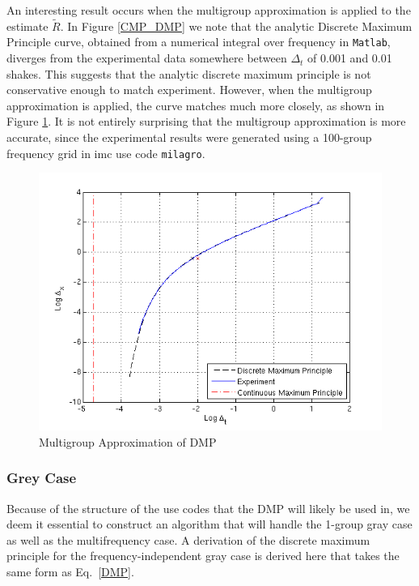 An interesting result occurs when the multigroup approximation is applied to
the estimate $\tilde R$.  In Figure \ref{CMP_DMP} we note that the analytic
Discrete Maximum
Principle curve, obtained from a numerical integral over frequency in
\texttt{Matlab}, diverges from the experimental data somewhere between
$\Delta_t$ of 0.001 and 0.01 shakes.  This suggests that the analytic discrete
maximum principle is not conservative enough to match experiment.  However,
when the multigroup approximation is applied, the curve matches much more
closely, as shown in Figure \ref{mg_DMP}.  It is not entirely surprising that
the multigroup approximation is more accurate, since
the experimental results were generated using a 100-group frequency grid in
\gls{imc} use code \texttt{milagro}.
\begin{figure}[htb]
\centering
\includegraphics[width=0.7\linewidth]{graphics/grossMG}
\caption{Multigroup Approximation of DMP}
\label{mg_DMP}
\end{figure}


\subsubsection{Grey Case}
Because of the structure of the use codes that the DMP will likely be used in,
we deem it essential to construct an algorithm that will handle the 1-group gray
case as well as the multifrequency case.  A derivation of the discrete maximum 
principle for the frequency-independent gray case is derived here that takes
the same form as Eq.\ \eqref{DMP}.


